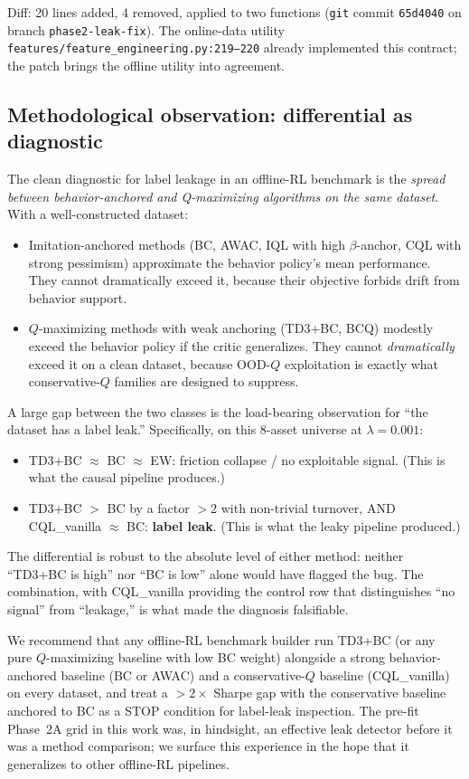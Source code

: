 Diff: 20 lines added, 4 removed, applied to two functions
(\texttt{git} commit \texttt{65d4040} on branch
\texttt{phase2-leak-fix}). The online-data utility
\texttt{features/feature\_engineering.py:219--220} already implemented
this contract; the patch brings the offline utility into agreement.

\subsection{Methodological observation: differential as diagnostic}
\label{app:leak:diagnostic}

The clean diagnostic for label leakage in an offline-RL benchmark is the
\emph{spread between behavior-anchored and Q-maximizing algorithms on
the same dataset}. With a well-constructed dataset:

\begin{itemize}\setlength\itemsep{0pt}
  \item Imitation-anchored methods (BC, AWAC, IQL with high
    $\beta$-anchor, CQL with strong pessimism) approximate the behavior
    policy's mean performance. They cannot dramatically exceed it,
    because their objective forbids drift from behavior support.
  \item $Q$-maximizing methods with weak anchoring (TD3+BC, BCQ) modestly
    exceed the behavior policy if the critic generalizes. They cannot
    \emph{dramatically} exceed it on a clean dataset, because OOD-$Q$
    exploitation is exactly what conservative-$Q$ families are designed
    to suppress.
\end{itemize}

A large gap between the two classes is the load-bearing observation
for ``the dataset has a label leak.'' Specifically, on this 8-asset
universe at $\lambda = 0.001$:

\begin{itemize}\setlength\itemsep{0pt}
  \item TD3+BC $\approx$ BC $\approx$ EW: friction collapse / no
    exploitable signal. (This is what the causal pipeline produces.)
  \item TD3+BC $>$ BC by a factor $> 2$ with non-trivial turnover, AND
    CQL\_vanilla $\approx$ BC: \textbf{label leak}. (This is what the
    leaky pipeline produced.)
\end{itemize}

The differential is robust to the absolute level of either method:
neither ``TD3+BC is high'' nor ``BC is low'' alone would have flagged
the bug. The combination, with CQL\_vanilla providing the
control row that distinguishes ``no signal'' from ``leakage,''
is what made the diagnosis falsifiable.

We recommend that any offline-RL benchmark builder run TD3+BC (or any
pure $Q$-maximizing baseline with low BC weight) alongside a strong
behavior-anchored baseline (BC or AWAC) and a conservative-$Q$ baseline
(CQL\_vanilla) on every dataset, and treat a $> 2\times$ Sharpe gap with
the conservative baseline anchored to BC as a STOP condition for
label-leak inspection. The pre-fit Phase~2A grid in this work was, in
hindsight, an effective leak detector before it was a method
comparison; we surface this experience in the hope that it generalizes
to other offline-RL pipelines.

